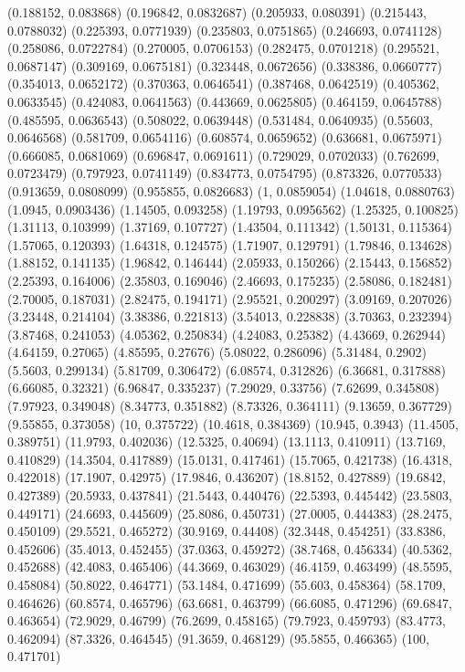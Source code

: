 {(0.188152, 0.083868)
(0.196842, 0.0832687)
(0.205933, 0.080391)
(0.215443, 0.0788032)
(0.225393, 0.0771939)
(0.235803, 0.0751865)
(0.246693, 0.0741128)
(0.258086, 0.0722784)
(0.270005, 0.0706153)
(0.282475, 0.0701218)
(0.295521, 0.0687147)
(0.309169, 0.0675181)
(0.323448, 0.0672656)
(0.338386, 0.0660777)
(0.354013, 0.0652172)
(0.370363, 0.0646541)
(0.387468, 0.0642519)
(0.405362, 0.0633545)
(0.424083, 0.0641563)
(0.443669, 0.0625805)
(0.464159, 0.0645788)
(0.485595, 0.0636543)
(0.508022, 0.0639448)
(0.531484, 0.0640935)
(0.55603, 0.0646568)
(0.581709, 0.0654116)
(0.608574, 0.0659652)
(0.636681, 0.0675971)
(0.666085, 0.0681069)
(0.696847, 0.0691611)
(0.729029, 0.0702033)
(0.762699, 0.0723479)
(0.797923, 0.0741149)
(0.834773, 0.0754795)
(0.873326, 0.0770533)
(0.913659, 0.0808099)
(0.955855, 0.0826683)
(1, 0.0859054)
(1.04618, 0.0880763)
(1.0945, 0.0903436)
(1.14505, 0.093258)
(1.19793, 0.0956562)
(1.25325, 0.100825)
(1.31113, 0.103999)
(1.37169, 0.107727)
(1.43504, 0.111342)
(1.50131, 0.115364)
(1.57065, 0.120393)
(1.64318, 0.124575)
(1.71907, 0.129791)
(1.79846, 0.134628)
(1.88152, 0.141135)
(1.96842, 0.146444)
(2.05933, 0.150266)
(2.15443, 0.156852)
(2.25393, 0.164006)
(2.35803, 0.169046)
(2.46693, 0.175235)
(2.58086, 0.182481)
(2.70005, 0.187031)
(2.82475, 0.194171)
(2.95521, 0.200297)
(3.09169, 0.207026)
(3.23448, 0.214104)
(3.38386, 0.221813)
(3.54013, 0.228838)
(3.70363, 0.232394)
(3.87468, 0.241053)
(4.05362, 0.250834)
(4.24083, 0.25382)
(4.43669, 0.262944)
(4.64159, 0.27065)
(4.85595, 0.27676)
(5.08022, 0.286096)
(5.31484, 0.2902)
(5.5603, 0.299134)
(5.81709, 0.306472)
(6.08574, 0.312826)
(6.36681, 0.317888)
(6.66085, 0.32321)
(6.96847, 0.335237)
(7.29029, 0.33756)
(7.62699, 0.345808)
(7.97923, 0.349048)
(8.34773, 0.351882)
(8.73326, 0.364111)
(9.13659, 0.367729)
(9.55855, 0.373058)
(10, 0.375722)
(10.4618, 0.384369)
(10.945, 0.3943)
(11.4505, 0.389751)
(11.9793, 0.402036)
(12.5325, 0.40694)
(13.1113, 0.410911)
(13.7169, 0.410829)
(14.3504, 0.417889)
(15.0131, 0.417461)
(15.7065, 0.421738)
(16.4318, 0.422018)
(17.1907, 0.42975)
(17.9846, 0.436207)
(18.8152, 0.427889)
(19.6842, 0.427389)
(20.5933, 0.437841)
(21.5443, 0.440476)
(22.5393, 0.445442)
(23.5803, 0.449171)
(24.6693, 0.445609)
(25.8086, 0.450731)
(27.0005, 0.444383)
(28.2475, 0.450109)
(29.5521, 0.465272)
(30.9169, 0.44408)
(32.3448, 0.454251)
(33.8386, 0.452606)
(35.4013, 0.452455)
(37.0363, 0.459272)
(38.7468, 0.456334)
(40.5362, 0.452688)
(42.4083, 0.465406)
(44.3669, 0.463029)
(46.4159, 0.463499)
(48.5595, 0.458084)
(50.8022, 0.464771)
(53.1484, 0.471699)
(55.603, 0.458364)
(58.1709, 0.464626)
(60.8574, 0.465796)
(63.6681, 0.463799)
(66.6085, 0.471296)
(69.6847, 0.463654)
(72.9029, 0.46799)
(76.2699, 0.458165)
(79.7923, 0.459793)
(83.4773, 0.462094)
(87.3326, 0.464545)
(91.3659, 0.468129)
(95.5855, 0.466365)
(100, 0.471701)
}

